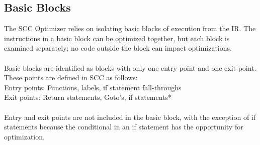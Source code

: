 \documentclass{scrartcl}
\begin{document}
\subsection{Basic Blocks}
The SCC Optimizer relies on isolating basic blocks of execution from the IR. The instructions in a basic block can be optimized together, but each block is examined separately; no code outside the block can impact optimizations.\\
\\
Basic blocks are identified as blocks with only one entry point and one exit point. These points are defined in SCC as follows:\\
\indent\indent Entry points: Functions, labels, if statement fall-throughs\\
\indent\indent Exit points: Return statements, Goto's, if statements*\\
\\
Entry and exit points are not included in the basic block, with the exception of if statements because the conditional in an if statement has the opportunity for optimization.
\end{document}
